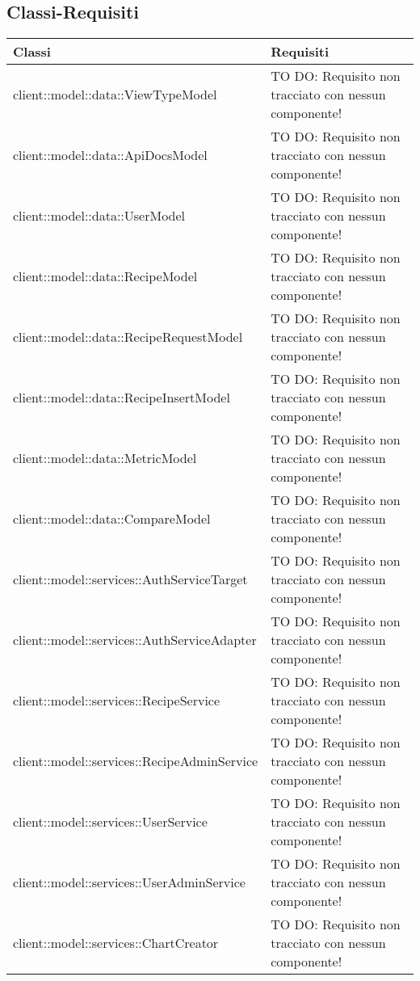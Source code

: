 \subsection{Classi-Requisiti} %
\label{sub:classi_requisiti}
\begin{center}
\def\arraystretch{1.5}
\bgroup
\begin{longtable}{| p{11cm} | p{2.5cm} |}
\hline
\textbf{Classi} & \textbf{Requisiti} \\
\hline
client::model::data::ViewTypeModel & TO DO: Requisito non tracciato con nessun componente! \\
\hline
client::model::data::ApiDocsModel & TO DO: Requisito non tracciato con nessun componente! \\
\hline
client::model::data::UserModel & TO DO: Requisito non tracciato con nessun componente! \\
\hline
client::model::data::RecipeModel & TO DO: Requisito non tracciato con nessun componente! \\
\hline
client::model::data::RecipeRequestModel & TO DO: Requisito non tracciato con nessun componente! \\
\hline
client::model::data::RecipeInsertModel & TO DO: Requisito non tracciato con nessun componente! \\
\hline
client::model::data::MetricModel & TO DO: Requisito non tracciato con nessun componente! \\
\hline
client::model::data::CompareModel & TO DO: Requisito non tracciato con nessun componente! \\
\hline
client::model::services::AuthServiceTarget & TO DO: Requisito non tracciato con nessun componente! \\
\hline
client::model::services::AuthServiceAdapter & TO DO: Requisito non tracciato con nessun componente! \\
\hline
client::model::services::RecipeService & TO DO: Requisito non tracciato con nessun componente! \\
\hline
client::model::services::RecipeAdminService & TO DO: Requisito non tracciato con nessun componente! \\
\hline
client::model::services::UserService & TO DO: Requisito non tracciato con nessun componente! \\
\hline
client::model::services::UserAdminService & TO DO: Requisito non tracciato con nessun componente! \\
\hline
client::model::services::ChartCreator & TO DO: Requisito non tracciato con nessun componente! \\

\end{longtable}
\end{center}
